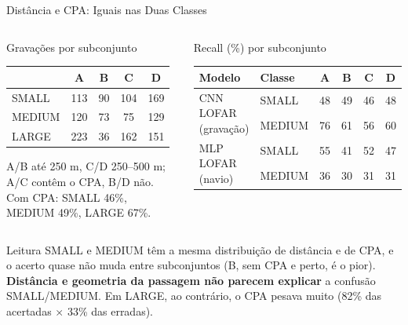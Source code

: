 \documentclass[aspectratio=169]{beamer}
\begin{document}
\begin{frame}{Distância e CPA: Iguais nas Duas Classes}
    \footnotesize
    \begin{columns}[t]
        \begin{block}{\small Gravações por subconjunto}
            \scriptsize
            \centering
            \begin{tabular}{lcccc}
            \toprule
             & A & B & C & D \\
            \midrule
            SMALL & 113 & 90 & 104 & 169 \\
            MEDIUM & 120 & 73 & 75 & 129 \\
            LARGE & 223 & 36 & 162 & 151 \\
            \bottomrule
            \end{tabular}

            \vspace{0.05cm}
            {\tiny A/B até 250 m, C/D 250--500 m; A/C contêm o CPA, B/D não. Com CPA: SMALL 46\%, MEDIUM 49\%, LARGE 67\%.\par}
        \end{block}
        \begin{block}{\small Recall (\%) por subconjunto}
            \scriptsize
            \centering
            \setlength{\tabcolsep}{4pt}
            \begin{tabular}{llcccc}
            \toprule
            Modelo & Classe & A & B & C & D \\
            \midrule
            \multirow{2}{*}{CNN LOFAR (gravação)} & SMALL & 48 & 49 & 46 & 48 \\
             & MEDIUM & 76 & 61 & 56 & 60 \\
            \midrule
            \multirow{2}{*}{MLP LOFAR (navio)} & SMALL & 55 & 41 & 52 & 47 \\
             & MEDIUM & 36 & 30 & 31 & 31 \\
            \bottomrule
            \end{tabular}
        \end{block}
    \end{columns}
    \vspace{0.1cm}
    \begin{alertblock}{Leitura}
        \scriptsize
        SMALL e MEDIUM têm a mesma distribuição de distância e de CPA, e o acerto quase não muda entre subconjuntos (B, sem CPA e perto, é o pior). \textbf{Distância e geometria da passagem não parecem explicar} a confusão SMALL/MEDIUM. Em LARGE, ao contrário, o CPA pesava muito (82\% das acertadas $\times$ 33\% das erradas).
    \end{alertblock}
\end{frame}
\end{document}
